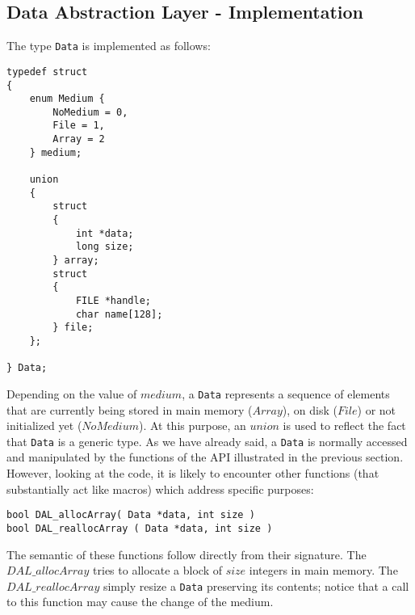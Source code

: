 \subsection*{Data Abstraction Layer - Implementation}
\label{DAL-impl}
The type \texttt{Data} is implemented as follows:
\begin{lstlisting}
typedef struct
{
	enum Medium {
		NoMedium = 0,
		File = 1,
		Array = 2
	} medium;
	
	union
	{
		struct
		{
			int *data;
			long size;
		} array;
		struct
		{
			FILE *handle;
			char name[128];
		} file;
	};
	
} Data;
\end{lstlisting}
Depending on the value of $medium$, a \texttt{Data} represents a sequence of elements that are currently being stored in main memory ($Array$), on disk ($File$) or not initialized yet ($NoMedium$). At this purpose, an $union$ is used to reflect the fact that \texttt{Data} is a generic type.  As we have already said, a \texttt{Data} is normally accessed and manipulated by the functions of the API illustrated in the previous section. However, looking at the code, it is likely to encounter other functions (that substantially act like macros) which address specific purposes: 
\begin{lstlisting}
bool DAL_allocArray( Data *data, int size )
bool DAL_reallocArray ( Data *data, int size )
\end{lstlisting}
The semantic of these functions follow directly from their signature. The $DAL\_allocArray$ tries to allocate a block of $size$ integers in main memory. The $DAL\_reallocArray$ simply resize a \texttt{Data} preserving its contents; notice that a call to this function may cause the change of the medium. 


